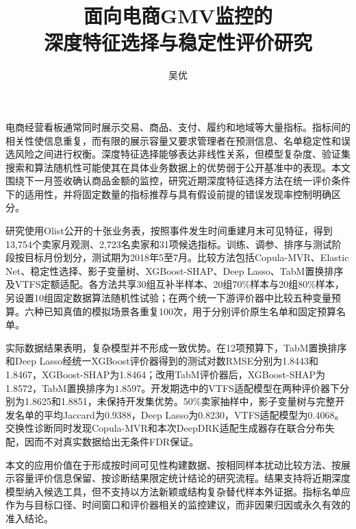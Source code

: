 \documentclass{sufethesismas}
\begin{document}
\classification{}\confidential{}\UDC{}\serialnumber{}
\title{面向电商GMV监控的\\深度特征选择与稳定性评价研究}
\author{吴优}
\maketitle
\frontmatter
\begin{abstractCN}电商经营看板通常同时展示交易、商品、支付、履约和地域等大量指标。指标间的相关性使信息重复，而有限的展示容量又要求管理者在预测信息、名单稳定性和误选风险之间进行权衡。深度特征选择能够表达非线性关系，但模型复杂度、验证集搜索和算法随机性可能使其在具体业务数据上的优势弱于公开基准中的表现。本文围绕下一月签收确认商品金额的监控，研究近期深度特征选择方法在统一评价条件下的适用性，并将固定数量的指标推荐与具有假设前提的错误发现率控制明确区分。

研究使用Olist公开的十张业务表，按照事件发生时间重建月末可见特征，得到13,754个卖家月观测、2,723名卖家和31项候选指标。训练、调参、排序与测试阶段按目标月份划分，测试期为2018年5至7月。比较方法包括Copula-MVR、Elastic Net、稳定性选择、影子变量树、XGBoost-SHAP、Deep Lasso、TabM置换排序及VTFS定额适配。各方法共享30组互补半样本、20组70\%样本与20组80\%样本，另设置10组固定数据算法随机性试验；在两个统一下游评价器中比较五种变量预算。六种已知真值的模拟场景各重复100次，用于分别评价原生名单和固定预算名单。

实际数据结果表明，复杂模型并不形成一致优势。在12项预算下，TabM置换排序和Deep Lasso经统一XGBoost评价器得到的测试对数RMSE分别为1.8443和1.8467，XGBoost-SHAP为1.8464；改用TabM评价器后，XGBoost-SHAP为1.8572，TabM置换排序为1.8597。开发期选中的VTFS适配模型在两种评价器下分别为1.8625和1.8851，未保持开发集优势。50\%卖家抽样中，影子变量树与完整开发名单的平均Jaccard为0.9388，Deep Lasso为0.8230，VTFS适配模型为0.4068。交换性诊断同时发现Copula-MVR和本次DeepDRK适配生成器存在联合分布失配，因而不对真实数据给出无条件FDR保证。

本文的应用价值在于形成按时间可见性构建数据、按相同样本扰动比较方法、按展示容量评价信息保留、按诊断结果限定统计结论的研究流程。结果支持将近期深度模型纳入候选工具，但不支持以方法新颖或结构复杂替代样本外证据。指标名单应作为与目标口径、时间窗口和评价器相关的监控建议，而非因果归因或永久有效的准入结论。
\end{abstractCN}
\end{document}
